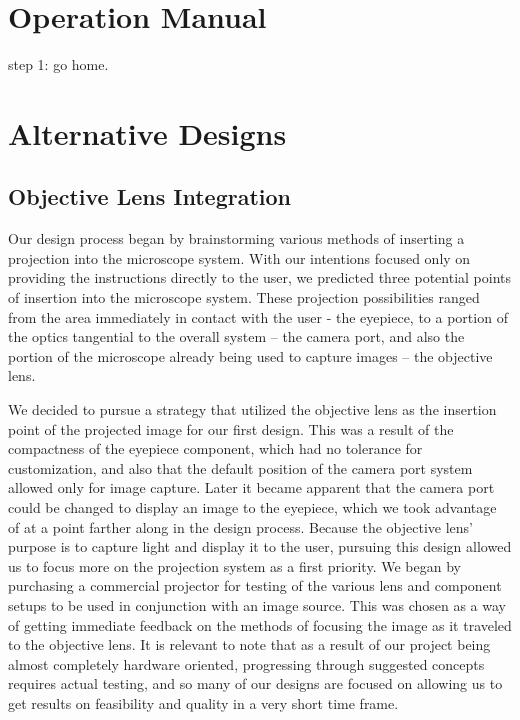\documentclass[12pt,a4paper]{article}
\begin{document}
\pagebreak
\begin{appendices}

\section{Operation Manual}


step 1: go home.

\section{Alternative Designs}
\subsection{Objective Lens Integration}
Our design process began by brainstorming various methods of inserting a projection into the microscope system.  With our intentions focused only on providing the instructions directly to the user, we predicted three potential points of insertion into the microscope system.  These projection possibilities ranged from the area immediately in contact with the user - the eyepiece, to a portion of the optics tangential to the overall system – the camera port, and also the portion of the microscope already being used to capture images – the objective lens.

We decided to pursue a strategy that utilized the objective lens as the insertion point of the projected image for our first design.  This was a result of the compactness of the eyepiece component, which had no tolerance for customization, and also that the default position of the camera port system allowed only for image capture.  Later it became apparent that the camera port could be changed to display an image to the eyepiece, which we took advantage of at a point farther along in the design process.
	Because the objective lens’ purpose is to capture light and display it to the user, pursuing this design allowed us to focus more on the projection system as a first priority.  We began by purchasing a commercial projector for testing of the various lens and component setups to be used in conjunction with an image source.  This was chosen as a way of getting immediate feedback on the methods of focusing the image as it traveled to the objective lens.  It is relevant to note that as a result of our project being almost completely hardware oriented, progressing through suggested concepts requires actual testing, and so many of our designs are focused on allowing us to get results on feasibility and quality in a very short time frame.


\end{appendices}
\end{document}
